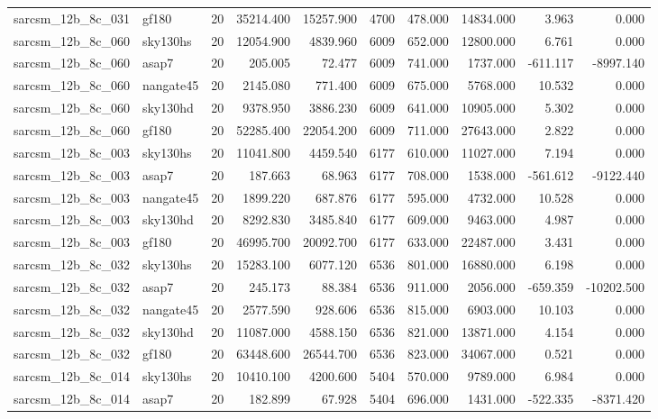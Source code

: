 \begin{tabular}{llrrrrrrrr}
sarcsm\_12b\_8c\_031 & gf180 & 20 & 35214.400 & 15257.900 & 4700 & 478.000 & 14834.000 & 3.963 & 0.000 \\
sarcsm\_12b\_8c\_060 & sky130hs & 20 & 12054.900 & 4839.960 & 6009 & 652.000 & 12800.000 & 6.761 & 0.000 \\
sarcsm\_12b\_8c\_060 & asap7 & 20 & 205.005 & 72.477 & 6009 & 741.000 & 1737.000 & -611.117 & -8997.140 \\
sarcsm\_12b\_8c\_060 & nangate45 & 20 & 2145.080 & 771.400 & 6009 & 675.000 & 5768.000 & 10.532 & 0.000 \\
sarcsm\_12b\_8c\_060 & sky130hd & 20 & 9378.950 & 3886.230 & 6009 & 641.000 & 10905.000 & 5.302 & 0.000 \\
sarcsm\_12b\_8c\_060 & gf180 & 20 & 52285.400 & 22054.200 & 6009 & 711.000 & 27643.000 & 2.822 & 0.000 \\
sarcsm\_12b\_8c\_003 & sky130hs & 20 & 11041.800 & 4459.540 & 6177 & 610.000 & 11027.000 & 7.194 & 0.000 \\
sarcsm\_12b\_8c\_003 & asap7 & 20 & 187.663 & 68.963 & 6177 & 708.000 & 1538.000 & -561.612 & -9122.440 \\
sarcsm\_12b\_8c\_003 & nangate45 & 20 & 1899.220 & 687.876 & 6177 & 595.000 & 4732.000 & 10.528 & 0.000 \\
sarcsm\_12b\_8c\_003 & sky130hd & 20 & 8292.830 & 3485.840 & 6177 & 609.000 & 9463.000 & 4.987 & 0.000 \\
sarcsm\_12b\_8c\_003 & gf180 & 20 & 46995.700 & 20092.700 & 6177 & 633.000 & 22487.000 & 3.431 & 0.000 \\
sarcsm\_12b\_8c\_032 & sky130hs & 20 & 15283.100 & 6077.120 & 6536 & 801.000 & 16880.000 & 6.198 & 0.000 \\
sarcsm\_12b\_8c\_032 & asap7 & 20 & 245.173 & 88.384 & 6536 & 911.000 & 2056.000 & -659.359 & -10202.500 \\
sarcsm\_12b\_8c\_032 & nangate45 & 20 & 2577.590 & 928.606 & 6536 & 815.000 & 6903.000 & 10.103 & 0.000 \\
sarcsm\_12b\_8c\_032 & sky130hd & 20 & 11087.000 & 4588.150 & 6536 & 821.000 & 13871.000 & 4.154 & 0.000 \\
sarcsm\_12b\_8c\_032 & gf180 & 20 & 63448.600 & 26544.700 & 6536 & 823.000 & 34067.000 & 0.521 & 0.000 \\
sarcsm\_12b\_8c\_014 & sky130hs & 20 & 10410.100 & 4200.600 & 5404 & 570.000 & 9789.000 & 6.984 & 0.000 \\
sarcsm\_12b\_8c\_014 & asap7 & 20 & 182.899 & 67.928 & 5404 & 696.000 & 1431.000 & -522.335 & -8371.420 \\

\end{tabular}
